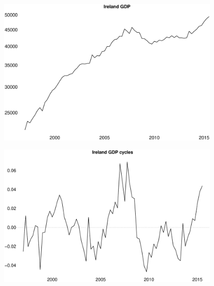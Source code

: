 \documentclass{beamer}
\begin{document}
\begin{frame}
  \begin{figure}
    \includegraphics[scale=.25]{ire_gdp.eps}
  \end{figure}
\end{frame}

\begin{frame}
  \begin{figure}
    \includegraphics[scale=.25]{ire_gdp_hp.eps}
  \end{figure}
\end{frame}
\end{document}
